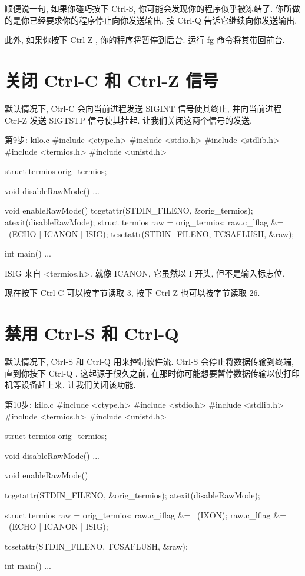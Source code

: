 \documentclass[lang=cn,newtx,10pt,scheme=chinese]{elegantbook}
\begin{document}
顺便说一句, 如果你碰巧按下 Ctrl-S, 你可能会发现你的程序似乎被冻结了. 你所做的是你已经要求你的程序停止向你发送输出. 按 Ctrl-Q 告诉它继续向你发送输出.

此外, 如果你按下 Ctrl-Z , 你的程序将暂停到后台. 运行 fg 命令将其带回前台.

\section{关闭 Ctrl-C 和 Ctrl-Z 信号}

默认情况下, Ctrl-C 会向当前进程发送 SIGINT 信号使其终止, 并向当前进程 Ctrl-Z 发送 SIGTSTP 信号使其挂起. 让我们关闭这两个信号的发送.

\begin{mycode}{第9步: kilo.c}
#include <ctype.h>
#include <stdio.h>
#include <stdlib.h>
#include <termios.h>
#include <unistd.h>

struct termios orig_termios;

void disableRawMode() { ... }

void enableRawMode() {
  tcgetattr(STDIN_FILENO, &orig_termios);
  atexit(disableRawMode);
  struct termios raw = orig_termios;
  raw.c_lflag &= ~(ECHO | ICANON | ISIG);
  tcsetattr(STDIN_FILENO, TCSAFLUSH, &raw);
}

int main() { ... }
\end{mycode}

ISIG 来自 <termios.h>. 就像 ICANON, 它虽然以 I 开头, 但不是输入标志位.

现在按下 Ctrl-C 可以按字节读取 3, 按下 Ctrl-Z 也可以按字节读取 26.

\section{禁用 Ctrl-S 和 Ctrl-Q}

默认情况下, Ctrl-S 和 Ctrl-Q 用来控制软件流. Ctrl-S 会停止将数据传输到终端, 直到你按下 Ctrl-Q . 这起源于很久之前, 在那时你可能想要暂停数据传输以使打印机等设备赶上来. 让我们关闭该功能.

\begin{mycode}{第10步: kilo.c}
#include <ctype.h>
#include <stdio.h>
#include <stdlib.h>
#include <termios.h>
#include <unistd.h>

struct termios orig_termios;

void disableRawMode() { ... }

void enableRawMode() {
  tcgetattr(STDIN_FILENO, &orig_termios);
  atexit(disableRawMode);

  struct termios raw = orig_termios;
  raw.c_iflag &= ~(IXON);
  raw.c_lflag &= ~(ECHO | ICANON | ISIG);

  tcsetattr(STDIN_FILENO, TCSAFLUSH, &raw);
}

int main() { ... }
\end{mycode}
\end{document}
